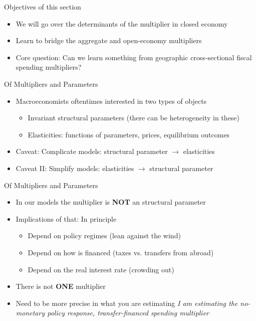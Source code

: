\documentclass[english,xcolor=svgnames]{beamer}
\begin{document}
\begin{frame}{Objectives of this section}
\begin{itemize}
\item We will go over the determinants of the multiplier in closed economy \\ {\color{gray}{Follow Woodford (2011) ``simple analytics'' paper}}
\item Learn to bridge the aggregate and open-economy multipliers \\ {\color{gray}{Use Chodorow-Reich (2019), Nakamura Steinsson (2014), Farhi Werning (2016)}}
\item Core question: Can we learn something from geographic cross-sectional fiscal spending multipliers?
\end{itemize}
\end{frame}

\begin{frame}{Of Multipliers and Parameters}
\begin{itemize}
\item Macroeconomists oftentimes interested in two types of objects
\begin{itemize}
\item Invariant structural parameters (there can be heterogeneity in these)
\item Elasticities: functions of parameters, prices, equilibrium outcomes
\end{itemize}
\item Caveat: Complicate models: structural parameter $\rightarrow$ elasticities
\item Caveat II: Simplify models: elasticities $\rightarrow$ structural parameter
\end{itemize}
\end{frame}


\begin{frame}{Of Multipliers and Parameters}
\begin{itemize}
\item In our models the multiplier is \textbf{NOT} an structural parameter
\item Implications of that: In principle
\begin{itemize}
\item Depend on policy regimes (lean against the wind)
\item Depend on how is financed (taxes vs. transfers from abroad)
\item Depend on the real interest rate (crowding out)
\end{itemize}
\item There is not \textbf{ONE} multiplier
\item Need to be more precise in what you are estimating
\textit{I am estimating the no-monetary policy response, transfer-financed spending multiplier}
\end{itemize}
\end{frame}
\end{document}
